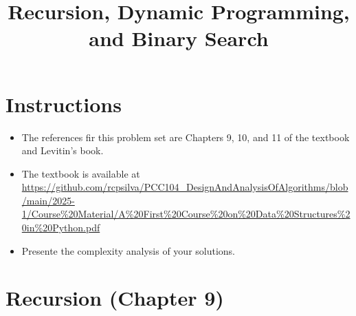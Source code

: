 \documentclass{article}
\title{Recursion, Dynamic Programming, and Binary Search}
\author{}
\date{}
\begin{document}
\maketitle

\section*{Instructions}

\begin{itemize}
    \item The references fir this problem set are Chapters 9, 10, and 11 of the textbook and Levitin's book.
    \item The textbook is available at \url{https://github.com/rcpsilva/PCC104_DesignAndAnalysisOfAlgorithms/blob/main/2025-1/Course%20Material/A%20First%20Course%20on%20Data%20Structures%20in%20Python.pdf}
    \item Presente the complexity analysis of your solutions.
\end{itemize}

\section*{Recursion (Chapter 9)}
\end{document}
